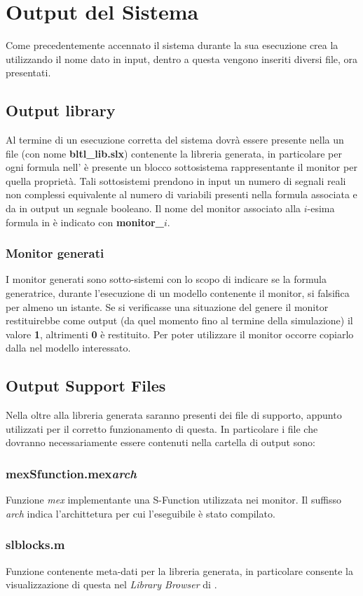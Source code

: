 \documentclass[10pt,a4paper]{article}
\newcommand{\OutputLibraryFileName}{\textbf{bltl\_lib.slx}}
\newcommand{\MonitorName}[1]{\textbf{monitor\_}$#1$}
\newcommand{\MexSFunction}{\textbf{mexSfunction.mex\emph{arch}}}
\begin{document}
	\section{Output del Sistema}
	Come precedentemente accennato il sistema durante la sua esecuzione crea la \OutputDir{} utilizzando il nome dato in input, dentro a  questa vengono inseriti diversi file, ora presentati.
	
	\subsection*{Output library} 
	Al termine di un esecuzione corretta del sistema dovrà essere presente nella \OutputDir{} un file (con nome \OutputLibraryFileName{}) contenente la libreria generata, in particolare per ogni formula nell' \InputFile{} è presente un blocco  sottosistema rappresentante il monitor per quella proprietà. Tali sottosistemi prendono in input un numero di segnali reali non complessi equivalente al numero di variabili presenti nella formula associata e da in output un segnale booleano.
	Il nome del monitor associato alla $i$-esima formula in \InputFile{} è indicato con \MonitorName{i}.
	
	\subsubsection*{Monitor generati}
	I monitor generati sono sotto-sistemi con lo scopo di indicare se la formula generatrice, durante l'esecuzione di un modello contenente il monitor, si falsifica per almeno un istante. Se si verificasse una situazione del genere il monitor restituirebbe come output (da quel momento fino al termine della simulazione) il valore \textbf{1}, altrimenti \textbf{0} è restituito.	
	Per poter utilizzare il monitor occorre copiarlo dalla \OutputLibrary{} nel modello interessato.
	
	\subsection*{Output Support Files}
	Nella \OutputDir{} oltre alla libreria generata saranno presenti dei file di supporto, appunto utilizzati per il corretto funzionamento di questa. In particolare i file che dovranno necessariamente essere contenuti nella cartella di output sono:
	
	\begin{multicols}{2}
		 \subsubsection*{\MexSFunction} Funzione \emph{mex} implementante una S-Function utilizzata nei monitor. Il suffisso \emph{arch} indica l'archittetura per cui l'eseguibile è stato compilato.\vfill\null\columnbreak
		 \subsubsection*{slblocks.m} Funzione \Matlab{} contenente meta-dati per la libreria generata, in particolare consente la visualizzazione di questa nel \emph{Library Browser} di \Simulink.
	\end{multicols}
\end{document}
